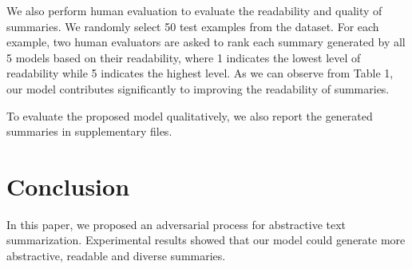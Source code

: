\documentclass[letterpaper]{article} \usepackage{aaai18}  \usepackage{times}  \usepackage{helvet}  \usepackage{courier}  \usepackage{url}  \usepackage{graphicx}  \frenchspacing  \usepackage{multirow}
\begin{document}
We also perform human evaluation to evaluate the readability and quality of summaries. We randomly select 50 test examples from the dataset. For each example, two human evaluators are asked to rank each summary generated by all 5 models based on their readability, where 1 indicates the lowest level of readability while 5 indicates the highest level. As we can observe from Table 1,  our model contributes significantly to improving the readability of summaries.

To evaluate the proposed model qualitatively, we also report the generated summaries in supplementary files.

\section{Conclusion}
In this paper, we proposed an adversarial process for abstractive text summarization. Experimental results showed that our model could generate more abstractive, readable and diverse summaries.




\end{document}
